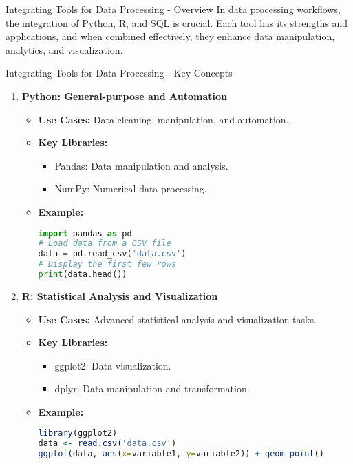 \documentclass[aspectratio=169]{beamer}
\begin{document}
\begin{frame}[fragile]{Integrating Tools for Data Processing - Overview}
  In data processing workflows, the integration of Python, R, and SQL is crucial. Each tool has its strengths and applications, and when combined effectively, they enhance data manipulation, analytics, and visualization.
\end{frame}

\begin{frame}[fragile]{Integrating Tools for Data Processing - Key Concepts}
  \begin{enumerate}
    \item \textbf{Python: General-purpose and Automation}
      \begin{itemize}
        \item \textbf{Use Cases:} Data cleaning, manipulation, and automation.
        \item \textbf{Key Libraries:} 
          \begin{itemize}
            \item Pandas: Data manipulation and analysis.
            \item NumPy: Numerical data processing.
          \end{itemize}
        \item \textbf{Example:}
        \begin{lstlisting}[language=Python]
import pandas as pd
# Load data from a CSV file
data = pd.read_csv('data.csv')
# Display the first few rows
print(data.head())
        \end{lstlisting}
      \end{itemize}
    
    \item \textbf{R: Statistical Analysis and Visualization}
      \begin{itemize}
        \item \textbf{Use Cases:} Advanced statistical analysis and visualization tasks.
        \item \textbf{Key Libraries:}
          \begin{itemize}
            \item ggplot2: Data visualization.
            \item dplyr: Data manipulation and transformation.
          \end{itemize}
        \item \textbf{Example:}
        \begin{lstlisting}[language=R]
library(ggplot2)
data <- read.csv('data.csv')
ggplot(data, aes(x=variable1, y=variable2)) + geom_point()
        \end{lstlisting}
      \end{itemize}
    

\end{enumerate}
\end{frame}
\end{document}
